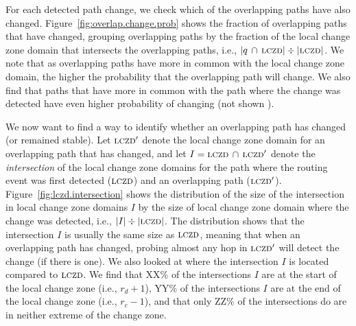 For each detected path change, we check which of the overlapping
paths have also changed.  Figure~\ref{fig:overlap.change.prob} shows
the fraction of overlapping paths that have changed, grouping
overlapping paths by the fraction of the local change zone domain
that intersects the overlapping paths, i.e.,
$|q\,\cap\,\mathrm{\textsc{lczd}}|\div|\mathrm{\textsc{lczd}}|$.  We note that as overlapping paths
have more in common with the local change zone domain, the higher
the probability that the overlapping path will change.  We also find
that paths that have more in common with the path where the change
was detected have even higher probability of changing (not shown
).

We now want to find a way to identify whether an overlapping path
has changed (or remained stable).  Let $\mathrm{\textsc{lczd}}'$ denote the local
change zone domain for an overlapping path that has changed, and let
$I = \mathrm{\textsc{lczd}}\,\cap\,\mathrm{\textsc{lczd}}'$ denote the \emph{intersection} of the
local change zone domains for the path where the routing event was
first detected ($\mathrm{\textsc{lczd}}$) and an overlapping path ($\mathrm{\textsc{lczd}}'$).
Figure~\ref{fig:lczd.intersection} shows the distribution of the
size of the intersection in local change zone domains $I$ by the
size of local change zone domain where the change was detected,
i.e., $|I|\div|\mathrm{\textsc{lczd}}|$.  The distribution shows that the
intersection $I$ is usually the same size as $\mathrm{\textsc{lczd}}$, meaning that
when an overlapping path has changed, probing almost any hop in
$\mathrm{\textsc{lczd}}'$ will detect the change (if there is one).  We also looked
at where the intersection $I$ is located compared to $\mathrm{\textsc{lczd}}$.  We
find that XX\% of the intersections $I$ are at the start of the
local change zone (i.e., $r_d + 1$), YY\% of the intersections $I$
are at the end of the local change zone (i.e., $r_c - 1$), and that
only ZZ\% of the intersections do are in neither extreme of the
change zone.

